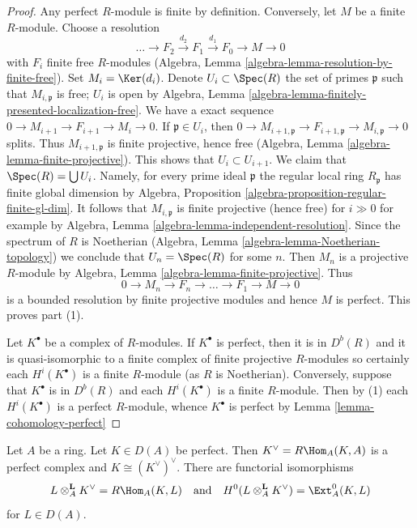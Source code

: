 \begin{proof}
Any perfect $R$-module is finite by definition. Conversely, let $M$ be
a finite $R$-module. Choose a resolution
$$
\ldots \to F_2 \xrightarrow{d_2} F_1 \xrightarrow{d_1} F_0 \to M \to 0
$$
with $F_i$ finite free $R$-modules
(Algebra, Lemma \ref{algebra-lemma-resolution-by-finite-free}).
Set $M_i = \Ker(d_i)$. Denote $U_i \subset \Spec(R)$ the set of primes
$\mathfrak p$ such that $M_{i, \mathfrak p}$ is free; $U_i$ is open by
Algebra, Lemma \ref{algebra-lemma-finitely-presented-localization-free}.
We have a exact sequence $0 \to M_{i + 1} \to F_{i + 1} \to M_i \to 0$.
If $\mathfrak p \in U_i$, then
$0 \to M_{i + 1, \mathfrak p} \to F_{i + 1, \mathfrak p} \to
M_{i, \mathfrak p} \to 0$ splits. Thus $M_{i + 1, \mathfrak p}$
is finite projective, hence free 
(Algebra, Lemma \ref{algebra-lemma-finite-projective}).
This shows that $U_i \subset U_{i + 1}$.
We claim that $\Spec(R) = \bigcup U_i$. Namely, for every prime ideal
$\mathfrak p$ the regular local ring $R_\mathfrak p$ has finite
global dimension by
Algebra, Proposition \ref{algebra-proposition-regular-finite-gl-dim}.
It follows that $M_{i, \mathfrak p}$ is finite projective
(hence free) for
$i \gg 0$ for example by Algebra, Lemma
\ref{algebra-lemma-independent-resolution}.
Since the spectrum of $R$ is Noetherian
(Algebra, Lemma \ref{algebra-lemma-Noetherian-topology})
we conclude that $U_n = \Spec(R)$
for some $n$. Then $M_n$ is a projective $R$-module by
Algebra, Lemma \ref{algebra-lemma-finite-projective}.
Thus
$$
0 \to M_n \to F_n \to \ldots \to F_1 \to M \to 0
$$
is a bounded resolution by finite projective modules
and hence $M$ is perfect.
This proves part (1).

\medskip\noindent
Let $K^\bullet$ be a complex of $R$-modules.
If $K^\bullet$ is perfect, then it is in $D^b(R)$ and it is
quasi-isomorphic to a finite complex of finite projective $R$-modules
so certainly each $H^i(K^\bullet)$ is a finite $R$-module (as $R$ is
Noetherian). Conversely, suppose that $K^\bullet$ is in $D^b(R)$
and each $H^i(K^\bullet)$ is a finite $R$-module. Then by (1) each
$H^i(K^\bullet)$ is a perfect $R$-module, whence $K^\bullet$ is
perfect by
Lemma \ref{lemma-cohomology-perfect}
\end{proof}

\begin{lemma}
\label{lemma-dual-perfect-complex}
Let $A$ be a ring. Let $K \in D(A)$ be perfect. Then $K^\vee = R\Hom_A(K, A)$
is a perfect complex and $K \cong (K^\vee)^\vee$. There are functorial
isomorphisms
$$
L \otimes_A^\mathbf{L} K^\vee = R\Hom_A(K, L)
\quad\text{and}\quad
H^0(L \otimes_A^\mathbf{L} K^\vee) = \Ext_A^0(K, L)
$$
for $L \in D(A)$.
\end{lemma}

